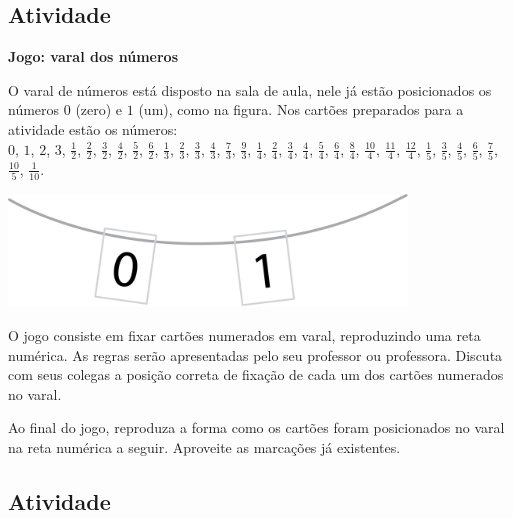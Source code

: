 \subsection{Atividade}

{\bf Jogo: varal dos números}

O varal de números está disposto na sala de aula, nele já estão posicionados os números $0$ (zero) e $1$ (um), como na figura. Nos cartões preparados para a atividade estão os números: \\
$0$, $1$, $2$, $3$, $\frac{1}{2}$, $\frac{2}{2}$, $\frac{3}{2}$, $\frac{4}{2}$, $\frac{5}{2}$, $\frac{6}{2}$,
$\frac{1}{3}$, $\frac{2}{3}$, $\frac{3}{3}$, $\frac{4}{3}$, $\frac{7}{3}$, $\frac{9}{3}$,
$\frac{1}{4}$, $\frac{2}{4}$, $\frac{3}{4}$, $\frac{4}{4}$, $\frac{5}{4}$, $\frac{6}{4}$, $\frac{8}{4}$, $\frac{10}{4}$, $\frac{11}{4}$, $\frac{12}{4}$,
$\frac{1}{5}$, $\frac{3}{5}$, $\frac{4}{5}$, $\frac{6}{5}$, $\frac{7}{5}$, $\frac{10}{5}$,
$\frac{1}{10}$.

\begin{center}
\includegraphics[width=300pt, keepaspectratio]{..//media//cap3/secoes/png/ativ11_fig01.png} 
\end{center}


O jogo consiste em fixar cartões numerados em varal, reproduzindo uma reta numérica. As regras serão apresentadas pelo seu professor ou professora. Discuta com seus colegas a posição correta de fixação de cada um dos cartões numerados no varal. 

Ao final do jogo, reproduza a forma como os cartões foram posicionados no varal na reta numérica a seguir. Aproveite as marcações já existentes.

\begin{center}
\end{center}

\subsection{Atividade}

